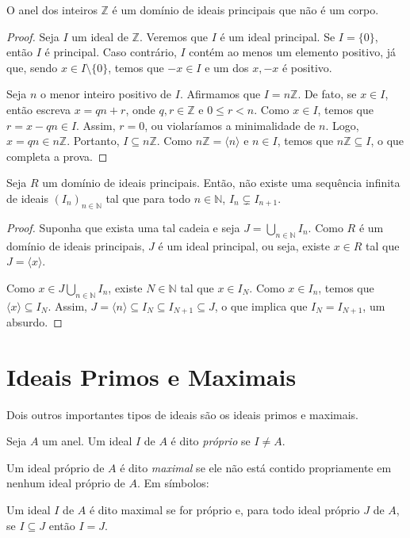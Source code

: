 \begin{prop} O anel dos inteiros $\mathbb Z$ é um domínio de ideais principais que não é um corpo.
\end{prop}
\begin{proof}
    Seja $I$ um ideal de $\mathbb Z$.
    Veremos que $I$ é um ideal principal.
    Se $I=\{0\}$, então $I$ é principal.
    Caso contrário, $I$ contém ao menos um elemento positivo, já que, sendo $x\in I\setminus\{0\}$, temos que $-x \in I$ e um dos $x, -x$ é positivo.

    Seja $n$ o menor inteiro positivo de $I$.
    Afirmamos que $I=n\mathbb Z$.
    De fato, se $x \in I$, então escreva $x=qn+r$, onde $q,r \in \mathbb Z$ e $0\leq r<n$.
    Como $x \in I$, temos que $r=x-qn \in I$. Assim, $r=0$, ou violaríamos a minimalidade de $n$.
    Logo, $x=qn\in n\mathbb Z$.
    Portanto, $I\subseteq n\mathbb Z$.
    Como $n\mathbb Z=\langle n\rangle$ e $n \in I$, temos que $n\mathbb Z\subseteq I$, o que completa a prova.
\end{proof}

\begin{prop}
    Seja $R$ um domínio de ideais principais.
    Então, não existe uma sequência infinita de ideais $(I_n)_{n \in \mathbb N}$ tal que para todo $n \in \mathbb N$, $I_n\subsetneq I_{n+1}$.
\end{prop}
\begin{proof}
    Suponha que exista uma tal cadeia e seja $J=\bigcup_{n \in \mathbb N} I_n$.
    Como $R$ é um domínio de ideais principais, $J$ é um ideal principal, ou seja, existe $x \in R$ tal que $J=\langle x\rangle$.
    
    Como $x \in J\bigcup_{n \in \mathbb N}I_n$, existe $N \in \mathbb N$ tal que $x \in I_N$.
    Como $x \in I_n$, temos que $\langle x\rangle \subseteq I_N$.
    Assim, $J=\langle n\rangle \subseteq I_N\subseteq I_{N+1}\subseteq J$, o que implica que $I_N=I_{N+1}$, um absurdo.
\end{proof}

\section{Ideais Primos e Maximais}
Dois outros importantes tipos de ideais são os ideais primos e maximais.

\begin{definition}
Seja $A$ um anel.
Um ideal $I$ de $A$ é dito \emph{próprio} se $I\neq A$.

Um ideal próprio de $A$ é dito \emph{maximal} se ele não está contido propriamente em nenhum ideal próprio de $A$.
Em símbolos:

Um ideal $I$ de $A$ é dito maximal se for próprio e, para todo ideal próprio $J$ de $A$, se $I\subseteq J$ então $I=J$.
\end{definition}

